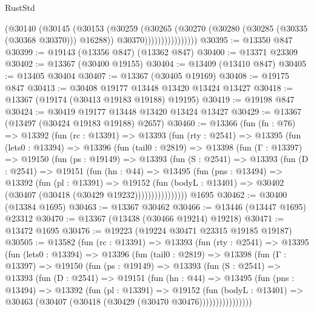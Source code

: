 \begin{lexlean}{RustStd}
\begin{coremodule}
                          (@30140
                            (@30145
                              (@30153
                                (@30259
                                  (@30265
                                    (@30270 (@30280 (@30285 (@30335 (@30368 @30370))) @16288))
                                    @30370))))))))))))))))
@30395 := @13350 @847
@30399 := @19143 (@13356 @847) (@13362 @847)
@30400 := @13371 @23309
@30402 := @13367 (@30400 @19155)
@30404 := @13409 (@13410 @847)
@30405 := @13405 @30404
@30407 := @13367 (@30405 @19169)
@30408 := @19175 @847
@30413 := @30408 @19177 @13448 @13420 @13424 @13427
@30418 := @13367 (@19174 (@30413 @19183 @19188) @19195)
@30419 := @19198 @847
@30424 := @30419 @19177 @13448 @13420 @13424 @13427
@30429 := @13367 (@13497 (@30424 @19183 @19188) @2657)
@30460 := @13366
    (fun (fn : @76) =>
    @13392
      (fun (rc : @13391) =>
      @13393
        (fun (rty : @2541) =>
        @13395
          (fun (lets0 : @13394) =>
          @13396
            (fun (tail0 : @2819) =>
            @13398
              (fun (Γ : @13397) =>
              @19150
                (fun (ps : @19149) =>
                @13393
                  (fun (S : @2541) =>
                  @13393
                    (fun (D : @2541) =>
                    @19151
                      (fun (hn : @44) =>
                      @13495
                        (fun (pns : @13494) =>
                        @13392
                          (fun (pl : @13391) =>
                          @19152
                            (fun (bodyL : @13401) =>
                            @30402 (@30407 (@30418 (@30429 @19232))))))))))))))))
    @1695
@30462 := @30400 (@13384 @1695)
@30463 := @13367 @30462
@30466 := @13446 (@13447 @1695) @23312
@30470 := @13367 (@13438 (@30466 @19214) @19218)
@30471 := @13472 @1695
@30476 := @19223 (@19224 @30471 @23315 @19185 @19187)
@30505 := @13582
    (fun (rc : @13391) =>
    @13393
      (fun (rty : @2541) =>
      @13395
        (fun (lets0 : @13394) =>
        @13396
          (fun (tail0 : @2819) =>
          @13398
            (fun (Γ : @13397) =>
            @19150
              (fun (ps : @19149) =>
              @13393
                (fun (S : @2541) =>
                @13393
                  (fun (D : @2541) =>
                  @19151
                    (fun (hn : @44) =>
                    @13495
                      (fun (pns : @13494) =>
                      @13392
                        (fun (pl : @13391) =>
                        @19152
                          (fun (bodyL : @13401) =>
                          @30463 (@30407 (@30418 (@30429 (@30470 @30476))))))))))))))))

\end{coremodule}
\end{lexlean}

